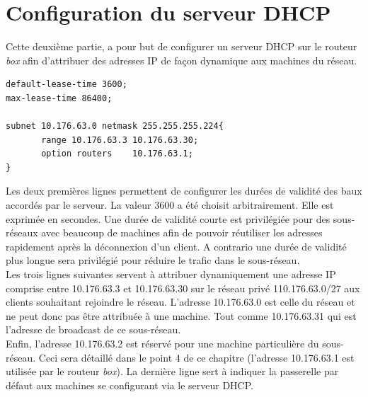\documentclass[12pt,a4paper,utf8x]{report}
\begin{document}
\section{Configuration du serveur DHCP}
Cette deuxième partie, a pour but de configurer un serveur DHCP sur le routeur \emph{box} afin d'attribuer des adresses IP de façon dynamique aux machines du réseau.
\begin{verbatim}
default-lease-time 3600;
max-lease-time 86400;

subnet 10.176.63.0 netmask 255.255.255.224{
       range 10.176.63.3 10.176.63.30;
       option routers    10.176.63.1;
}
\end{verbatim}
Les deux premières lignes permettent de configurer les durées de validité des baux accordés par le serveur.
La valeur 3600 a été choisit arbitrairement. Elle est exprimée en secondes. Une durée de validité courte est privilégiée pour des sous-réseaux avec beaucoup de machines afin de pouvoir réutiliser les adresses rapidement après la déconnexion d'un client. A contrario une durée de validité plus longue sera privilégié pour réduire le trafic dans le sous-réseau.\\
Les trois lignes suivantes servent à attribuer dynamiquement une adresse IP comprise entre 10.176.63.3 et 10.176.63.30 sur le réseau privé 110.176.63.0/27 aux clients souhaitant rejoindre le réseau.
L'adresse 10.176.63.0 est celle du réseau et ne peut donc pas être attribuée à une machine. Tout comme 10.176.63.31 qui est l'adresse de broadcast de ce sous-réseau.\\
Enfin, l'adresse 10.176.63.2 est réservé pour une machine particulière du sous-réseau. Ceci sera détaillé dans le point 4 de ce chapitre (l'adresse 10.176.63.1 est utilisée par le routeur \emph{box}).
La dernière ligne sert à indiquer la passerelle par défaut aux machines se configurant via le serveur DHCP. 
\end{document}
